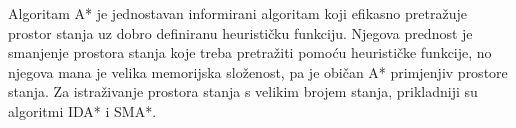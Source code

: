 Algoritam A* je jednostavan informirani algoritam koji efikasno pretražuje prostor stanja uz dobro definiranu heurističku funkciju.
Njegova prednost je smanjenje prostora stanja koje treba pretražiti pomoću heurističke funkcije, no njegova mana je velika memorijska složenost, pa je običan A* primjenjiv prostore stanja.
Za istraživanje prostora stanja s velikim brojem stanja, prikladniji su algoritmi IDA* i SMA*.
